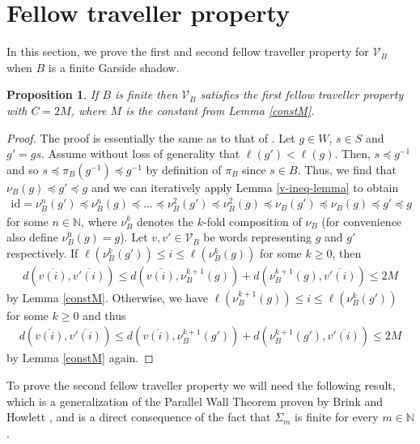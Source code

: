 \documentclass[a4paper,12pt,leqno]{amsart}
\newtheorem{prop}[theorem]{Proposition}
\theoremstyle{definition}
\newcommand{\N}{\mathbb{N}}
\newcommand{\V}{\mathcal{V}}
\newcommand{\id}{\text{id}}
\newcommand{\vr}{\nu}
\begin{document}
\section{Fellow traveller property} \label{section FTP}

In this section, we prove the first and second fellow traveller property for $\V_B$ when $B$ is a finite Garside shadow.

\begin{prop} \label{PropFTPa}
    If $B$ is finite then $\V_B$ satisfies the first fellow traveller property with $C = 2M$, where $M$ is the constant from Lemma \ref{constM}.
\end{prop}

\begin{proof}
    The proof is essentially the same as to that of \cite[Cor~5.2]{OP-bi}. Let $g \in W$, $s \in S$ and $g' = gs$. Assume without loss of generality that $\ell(g') < \ell(g)$. Then, $s \preceq g^{-1}$ and so $s \preceq \pi_B(g^{-1}) \preceq g^{-1}$ by definition of $\pi_B$ since $s \in B$. Thus, we find that $\vr_B(g) \preceq g' \preceq g$ and we can iteratively apply Lemma \ref{v-ineq-lemma} to obtain
    \begin{align*}
        \id = \vr_B^n(g') \preceq \vr_B^n(g) \preceq \ldots \preceq \vr_B^2(g') \preceq \vr_B^2(g) \preceq \vr_B(g') \preceq \vr_B(g) \preceq g' \preceq g 
    \end{align*}
    for some $n \in \N$, where $\vr_B^k$ denotes the $k$-fold composition of $\vr_B$ (for convenience also define $\vr_B^0(g) = g$). Let $v,v' \in \V_B$ be words representing $g$ and $g'$ respectively. If $\ell(\vr_B^k(g')) \leq i \leq \ell(\vr_B^k(g))$ for some $k \geq 0$, then 
    \begin{align*}
        d(\overline{v(i)},\overline{v'(i)}) \leq d(\overline{v(i)},\vr_B^{k+1}(g)) + d(\vr_B^{k+1}(g),\overline{v'(i)}) \leq 2M
    \end{align*}
    by Lemma \ref{constM}. Otherwise, we have $\ell(\vr_B^{k+1}(g)) \leq i \leq \ell(\vr_B^k(g'))$ for some $k \geq 0$ and thus
    \begin{align*}
        d(\overline{v(i)},\overline{v'(i)}) \leq d(\overline{v(i)},\vr_B^{k+1}(g')) + d(\vr_B^{k+1}(g'),\overline{v'(i)}) \leq 2M
    \end{align*}
    by Lemma \ref{constM} again.
\end{proof} 

To prove the second fellow traveller property we will need the following result, which is a generalization of the  Parallel Wall Theorem proven by Brink and Howlett \cite[Thm 2.8]{BH-par}, and is a direct consequence of the fact that $\Sigma_m$ is finite for every $m \in \N$  \cite{Fu-E_m}.
\end{document}
